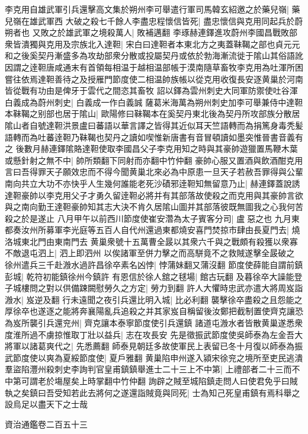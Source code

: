 李克用自雄武軍引兵還擊高文集於朔州李可舉遣行軍司馬韓玄紹邀之於藥兒嶺|{
	藥兒嶺在雄武軍西}
大破之殺七千餘人李盡忠程懷信皆死|{
	盡忠懷信與克用同起兵於蔚朔者也}
又敗之於雄武軍之境殺萬人|{
	敗補邁翻}
李琢赫連鐸進攻蔚州李國昌戰敗部衆皆潰獨與克用及宗族北入達靼|{
	宋白曰達靼者本東北方之夷蓋靺鞨之部也貞元元和之後奚契丹漸盛多為攻劫部衆分散或投屬契丹或依於勃海漸流徙于隂山其俗語訛因謂之逹靼唐咸通末有首領每相温于越相温部帳于漠南隨草畜牧李克用為吐渾所困嘗往依焉達靼善待之及授雁門節度使二相温帥族帳以從克用收復長安逐黄巢於河南皆從戰有功由是俾牙于雲代之間恣其畜牧}
詔以鐸為雲州刺史大同軍防禦使吐谷渾白義成為蔚州刺史|{
	白義成一作白義誠}
薩葛米海萬為朔州刺史加李可舉兼侍中達靼本靺鞨之别部也居于隂山|{
	歐陽修曰靺鞨本在奚契丹東北後為契丹所攻部族分散居隂山者自號達靼洪景盧曰蕃語以華言譯之皆得其近似耳天竺語轉而為捐篤身毒秃髪語轉而為吐蕃逹靼乃靺鞨也契丹之讀如喫惟新唐書有音冒頓讀如墨突惟晉書音義有之}
後數月赫連鐸隂賂達靼使取李國昌父子李克用知之時與其豪帥遊獵置馬鞭木葉或懸針射之無不中|{
	帥所類翻下同射而亦翻中竹仲翻}
豪帥心服又置酒與飲酒酣克用言曰吾得罪天子願效忠而不得今聞黄巢北來必為中原患一旦天子若赦吾罪得與公輩南向共立大功不亦快乎人生幾何誰能老死沙磧邪逹靼知無留意乃止|{
	赫連鐸蓋說誘達靼豪帥以李克用父子才勇久留逹靼必將并有其部落故使殺之而克用與其豪帥言欲與之南向勤王達靼豪帥知其志大決不肯久居隂山圖并其部落彼既無圖我之心我何苦殺之於是遂止}
八月甲午以前西川節度使崔安濳為太子賓客分司|{
	盧惡之也}
九月東都奏汝州所募軍李光庭等五百人自代州還過東都燒安喜門焚掠市肆由長夏門去|{
	燒洛城東北門由東南門去}
黄巢衆號十五萬曹全晸以其衆六千與之戰頗有殺獲以衆寡不敵退屯泗上|{
	泗上即泗州}
以俟諸軍至併力擊之而高駢竟不之救賊遂擊全晸破之　徐州遣兵三千赴溵水過許昌徐卒素名凶悖|{
	悖蒲妹翻又蒲沒翻}
節度使薛能自謂前鎮彭城|{
	乾符初能鎮徐州今鎮許}
有恩信於徐人舘之毬場|{
	館古玩翻}
及暮徐卒大譟能登子城樓問之對以供備踈闕慰勞久之方定|{
	勞力到翻}
許人大懼時忠武亦遣大將周岌詣溵水|{
	岌逆及翻}
行未遠聞之夜引兵還比明入城|{
	比必利翻}
襲擊徐卒盡殺之且怨能之厚徐卒也遂逐之能將奔襄陽亂兵追殺之并其家岌自稱留後汝鄭把截制置使齊克讓恐為岌所襲引兵還兖州|{
	齊克讓本泰寧節度使引兵還鎮}
諸道屯溵水者皆散黄巢遂悉衆度淮所過不虜掠惟取丁壯以益兵|{
	志在攻長安}
先是徵振武節度使吳師泰為左金吾大將軍以諸葛爽代之|{
	先悉薦翻}
師泰見朝廷多故使軍民上表留已冬十月復以師泰為振武節度使以爽為夏綏節度使|{
	夏戶雅翻}
黄巢陷申州遂入潁宋徐兖之境所至吏民逃潰　羣盜陷灃州殺刺史李詢判官皇甫鎮鎮舉進士二十三上不中第|{
	上禮部者二十三而不中第可謂老於塲屋矣上時掌翻中竹仲翻}
詢辟之賊至城陷鎮走問人曰使君免乎曰賊執之矣鎮曰吾受知若此去將何之遂還詣賊竟與同死|{
	士為知己死皇甫鎮有焉科舉之設烏足以盡天下之士哉}


資治通鑑卷二百五十三
